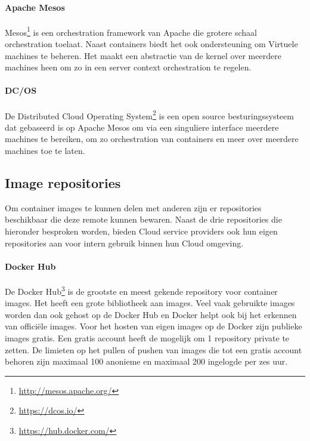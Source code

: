 \paragraph{Apache Mesos}
Mesos\footnote{\url{http://mesos.apache.org/}} is een orchestration framework van Apache die grotere schaal orchestration toelaat. Naast containers biedt het ook ondersteuning om Virtuele machines te beheren. Het maakt een abstractie van de kernel over meerdere machines heen om zo in een server context orchestration te regelen.
\paragraph{DC/OS}
De Distributed Cloud Operating System\footnote{\url{https://dcos.io/}} is een open source besturingssysteem dat gebaseerd is op Apache Mesos om via een singuliere interface meerdere machines te bereiken, om zo orchestration van containers en meer over meerdere machines toe te laten.
\subsection{Image repositories}
Om container images te kunnen delen met anderen zijn er repositories beschikbaar die deze remote kunnen bewaren. Naast de drie repositories die hieronder besproken worden, bieden Cloud service providers ook hun eigen repositories aan voor intern gebruik binnen hun Cloud omgeving.
\paragraph{Docker Hub}
De Docker Hub\footnote{\url{https://hub.docker.com/}} is de grootste en meest gekende repository voor container images. Het heeft een grote bibliotheek aan images. Veel vaak gebruikte images worden dan ook gehost op de Docker Hub en Docker helpt ook bij het erkennen van officiële images. Voor het hosten van eigen images op de Docker zijn publieke images gratis. Een gratis account heeft de mogelijk om 1 repository private te zetten. De limieten op het pullen of pushen van images die tot een gratis account behoren zijn maximaal 100 anonieme en maximaal 200 ingelogde per zes uur. 
